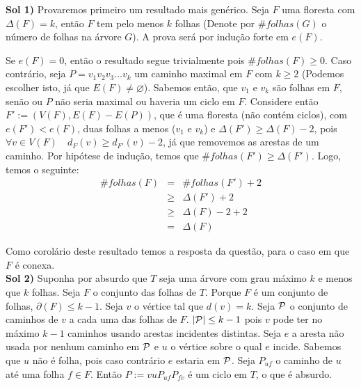 
 {\bf Sol 1)} Provaremos primeiro um resultado mais genérico.
%
Seja $F$ uma floresta com $\Delta(F) = k$, então $F$ tem pelo menos $k$ folhas (Denote por $\# folhas(G)$ o número de folhas na árvore $G$). A prova será por indução forte em $e(F)$.

Se $e(F) = 0$, então o resultado segue trivialmente pois $\# folhas(F) \ge 0$.
%
Caso contrário, seja $P = v_1v_2v_3\ldots v_k$ um caminho maximal em $F$ com $k \ge 2$ (Podemos escolher isto, já que $E(F) \ne \varnothing$).
%
Sabemos então, que $v_1$ e $v_k$ são folhas em $F$, senão ou $P$ não seria maximal ou haveria um ciclo em $F$.
%
Considere então $F' := (V(F),E(F)-E(P))$, que é uma floresta (não contém ciclos), com $e(F') < e(F)$, duas folhas a menos ($v_1$ e $v_k$) e $\Delta(F') \ge \Delta(F) - 2$, pois $\forall v\in V(F)\quad d_F(v) \ge d_{F'}(v) - 2$, já que removemos as arestas de um caminho.
%
Por hipótese de indução, temos que $\# folhas(F') \ge \Delta(F')$.
%
Logo, temos o seguinte: 
\begin{eqnarray}
	\#folhas(F) &=& \# folhas(F') + 2  \nonumber \\
		  &\ge& \Delta(F') + 2 	   \nonumber \\
		  &\ge& \Delta(F) - 2 + 2  \nonumber \\
		    &=& \Delta(F) \nonumber
\end{eqnarray}
\fimprova

Como corolário deste resultado temos a resposta da questão, para o caso em que $F$ é conexa.\\

{\bf Sol 2)} Suponha por absurdo que $T$ seja uma árvore com grau máximo $k$ e
menos que $k$ folhas. Seja $F$ o conjunto das folhas de $T$. Porque $F$ é um
conjunto de folhas, $\partial(F) \le k - 1$. Seja $v$ o vértice tal que
$d(v) = k$. Seja ${\cal P}$  o conjunto de caminhos de $v$ a cada uma das folhas
de $F$. $|{\cal P}| \le k - 1$ pois $v$ pode ter no máximo $k-1$ caminhos usando
arestas incidentes distintas. Seja $e$ a aresta não usada por nenhum caminho em
${\cal P}$ e $u$ o vértice sobre o qual $e$ incide. Sabemos que $u$ não é folha,
pois caso contrário $e$ estaria em ${\cal P}$. Seja $P_{uf}$ o caminho de $u$ até
uma folha $f \in F$. Então $P:=vuP_{uf}P_{fv}$ é um ciclo em $T$, o que é absurdo.\\

